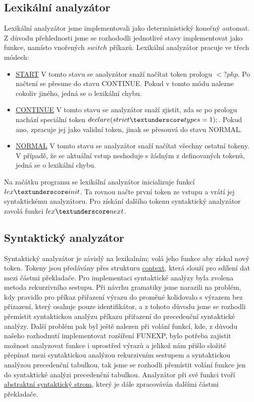 \documentclass[a4paper, 11pt]{article}
\begin{document}
		\subsection{Lexikální analyzátor}
	Lexikální analyzátor jsme implementovali jako deterministický konečný automat. Z důvodu přehlednosti jsme se rozhododli jednotlivé stavy implementovat 
	jako funkce, namísto vnořených $switch$ příkazů. Lexikální analyzátor pracuje ve třech módech:
	
	\begin{itemize}
		\item \hyperref[lex_START]{START}\newline
			V tomto stavu se analyzátor snaží načítat token prologu $<?php$. Po načtení se přesune do stavu CONTINUE. Pokud v tomto módu nalezne 
			cokoliv jiného, jedná se o lexikální chybu.
		\item \hyperref[lex_CONTINUE]{CONTINUE}\newline
			V tomto stavu se analyzátor snaží zjistit, zda se po prologu nachází speciální token $declare(strict \textunderscore types=1);$. Pokud ano, 
			zpracuje jej jako validní token, jinak se přesouvá do stavu NORMAL.
		\item \hyperref[lex_NORMAL]{NORMAL}\newline
			V tomto stavu se analyzátor snaží načítat všechny ostatní tokeny. V případě, že se aktuální vstup neshoduje s žádným z definovaných tokenů, 
			jedná se o lexikální chybu.
	\end{itemize}
	
	Na začátku programu se lexikální analyzátor inicializuje funkcí $lex \textunderscore init$. Ta rovnou načte první token ze vstupu a vrátí jej syntaktickému 
	analyzátoru. Pro získání dalšího tokenu syntaktický analyzátor zavolá funkci $lex \textunderscore next$.
	\subsection{Syntaktický analyzátor}
	Syntaktický analyzátor je závislý na lexikalním; volá jeho funkce aby získal nový token. Tokeny jsou předávány přes strukturu \hyperref[cont]{context}, která 
	slouží pro sdílení dat mezi částmi překladače. Pro implementaci syntaktické analýzy byla zvolena metoda rekurzivního sestupu. Při návrhu gramatiky jsme 
	narazili na problém, kdy pravidlo pro příkaz přiřazení výrazu do proměné kolidovalo s výrazem bez přizazení, který osahuje pouze identifikátor, a z tohoto 
	důvodu jsme se rozhodli přemístit syntaktickou analýzu příkazu přiřazení do precedenční syntaktické analýzy. Další problém pak byl ještě nalezen při volání 
	funkcí, kde, z důvodu našeho rozhodnutí implementovat rozšíření FUNEXP, bylo potřeba zajistit možnost analyzovat funkce i uprostřed výrazů a jelikož nám 
	přišlo složité přepínat mezi syntaktickou analýzou rekurzivním sestupem a syntaktickou analýzou precedenční tabulkou, tak jsme se rozhodli přemístit volání 
	funkce jen do syntaktické analýzi precedenční tabulkou. Analyzátor při své funkci tvoří \hyperref[abstrtree]{abstraktní syntaktický strom}, který je dále 
	zpracováván dalšími částmi překladače.
\end{document}
